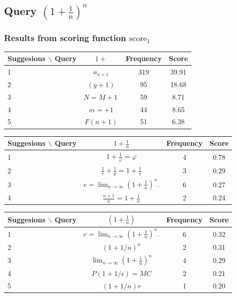 \documentclass[12pt]{article} %
\begin{document}

\subsection{Query $(1+ \frac 1 n)^n$}

\subsubsection{Results from scoring function $\text{score}_1$}
\begin{center}
\begin{tabular}{lccc}
Suggesions $\backslash$ Query  & $ 1+ $ & Frequency & Score \\
\hline
 1 &  $ \displaystyle a_{n+1} $ & 319 & 39.91 \\
 2 &  $ (y+1) $ & 95 & 18.68 \\
 3 &  $ N=M+1\, $ & 59 & 8.71 \\
 4 &  $ m=+1 $ & 44 & 8.65 \\
 5 &  $ F(n+1) $ & 51 & 6.38 \\
\end{tabular}
\end{center}

\begin{center}
\begin{tabular}{lccc}
Suggesions $\backslash$ Query  & $ 1+\frac 1 n $ & Frequency & Score \\
\hline
 1 &  $ 1+\frac{1}{\varphi}=\varphi $ & 4 & 0.78 \\
 2 &  $ \frac{1}{r}+\frac{1}{p}=1+\frac{1}{s} $ & 3 & 0.29 \\
 3 &  $ e=\lim_{n\to\infty}\left(1+\frac{1}{n}\right)^{n}. $ & 6 & 0.27 \\
 4 &  $ \frac{n+1}{n}=1+\frac{1}{n} $ & 2 & 0.24 \\
\end{tabular}
\end{center}

\begin{center}
\begin{tabular}{lccc}
Suggesions $\backslash$ Query  & $ (1+\frac 1 n) $ & Frequency & Score \\
\hline
 1 &  $ e=\lim_{n\to\infty}\left(1+\frac{1}{n}\right)^{n}. $ & 6 & 0.32 \\
 2 &  $ (1+1/n)^{n} $ & 2 & 0.31 \\
 3 &  $  \lim_{n\to\infty}\left(1+\frac{1}{n}\right)^{n} $ & 4 & 0.29 \\
 4 &  $ P(1+1/{\epsilon})=MC $ & 2 & 0.21 \\
 5 &  $ (1+1/n)r $ & 1 & 0.20 \\
\end{tabular}
\end{center}
\end{document}
